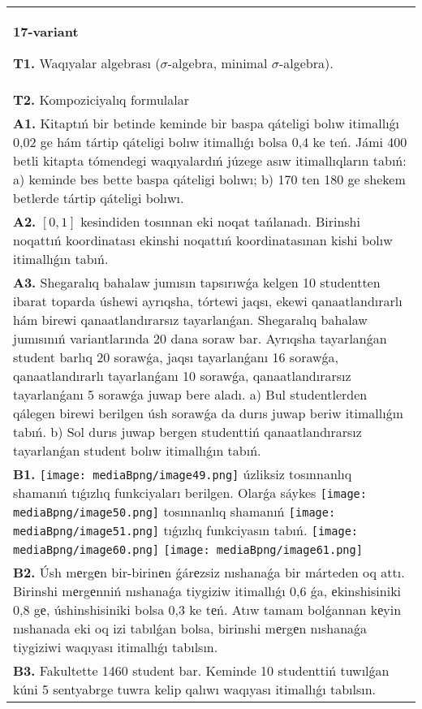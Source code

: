 \documentclass{article}
\begin{document}
\begin{tabular}{m{17cm}}
\textbf{17-variant}
\newline

\textbf{T1.} Waqıyalar algebrası ($\sigma$-algebra, minimal $\sigma$-algebra).
 \\
\textbf{T2.} Kompoziciyalıq formulalar \\
\textbf{A1.} Kitaptıń bir betinde keminde bir baspa qáteligi bolıw itimallıǵı 0,02 ge hám tártip qáteligi bolıw itimallıǵı bolsa 0,4 ke teń. Jámi 400 betli kitapta tómendegi waqıyalardıń júzege asıw itimallıqların tabıń: a) keminde bes bette baspa qáteligi bolıwı; b) 170 ten 180 ge shekem betlerde tártip qáteligi bolıwı.
 \\
\textbf{A2.} $\left[ 0,1 \right]$ kesindiden tosınnan eki noqat tańlanadı. Birinshi noqattıń koordinatası ekinshi noqattıń koordinatasınan kishi bolıw itimallıǵın tabıń.
 \\
\textbf{A3.} Shegaralıq bahalaw jumısın tapsırıwǵa kelgen 10 studentten ibarat toparda úshewi ayrıqsha, tórtewi jaqsı, ekewi qanaatlandırarlı hám birewi qanaatlandırarsız tayarlanǵan. Shegaralıq bahalaw jumısınıń variantlarında 20 dana soraw bar. Ayrıqsha tayarlanǵan student barlıq 20 sorawǵa, jaqsı tayarlanǵanı 16 sorawǵa, qanaatlandırarlı tayarlanǵanı 10 sorawǵa, qanaatlandırarsız tayarlanǵanı 5 sorawǵa juwap bere aladı. a) Bul studentlerden qálegen birewi berilgen úsh sorawǵa da durıs juwap beriw itimallıǵın tabıń. b) Sol durıs juwap bergen studenttiń qanaatlandırarsız tayarlanǵan student bolıw itimallıǵın tabıń.
 \\
\textbf{B1.} \texttt{[image: mediaBpng/image49.png]} úzliksiz tosınnanlıq shamanıń tıǵızlıq funkciyaları berilgen. Olarǵa sáykes \texttt{[image: mediaBpng/image50.png]} tosınnanlıq shamanıń \texttt{[image: mediaBpng/image51.png]} tıǵızlıq funkciyasın tabıń. \texttt{[image: mediaBpng/image60.png]} \texttt{[image: mediaBpng/image61.png]}
 \\
\textbf{B2.} Úsh mеrgеn bir-birinеn ǵárеzsiz nıshanaǵa bir márteden oq attı. Birinshi mеrgеnniń nıshanaǵa tiygiziw itimallıǵı 0,6 ǵa, еkinshisiniki 0,8 gе, úshinshisiniki bolsa 0,3 ke tеń. Atıw tamam bolǵannan kеyin nıshanada eki oq izi tabılǵan bolsa, birinshi mеrgеn nıshanaǵa tiygiziwi waqıyası itimallıǵı tabılsın.
 \\
\textbf{B3.} Fakultette 1460 student bar. Keminde 10 studenttiń tuwılǵan kúni 5 sentyabrge tuwra kelip qalıwı waqıyası itimallıǵı tabılsın.

\end{tabular}
\end{document}
